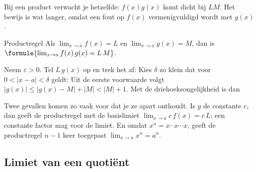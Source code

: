 Bij een product verwacht je hetzelfde: $f(x)g(x)$ komt dicht bij $LM$. Het bewijs is wat langer, omdat een fout op $f(x)$ vermenigvuldigd wordt met $g(x)$.

\begin{theorie}
\begin{stelling}{Productregel}
Als $\lim_{x \to a} f(x) = L$ en $\lim_{x \to a} g(x) = M$, dan is \quad $\formule{\lim_{x \to a} f(x)\,g(x) = L\,M}$.
\end{stelling}
\begin{bewijs}
Neem $\varepsilon > 0$. Tel $L\,g(x)$ op en trek het af:
Kies $\delta$ zo klein dat voor $0 < |x - a| < \delta$ geldt:
Uit de eerste voorwaarde volgt $|g(x)| \leqslant |g(x) - M| + |M| < |M| + 1$. Met de driehoeksongelijkheid is dan
\end{bewijs}
\end{theorie}

Twee gevallen komen zo vaak voor dat je ze apart onthoudt. Is $g$ de constante $c$, dan geeft de productregel met de basislimiet $\lim_{x \to a} c\,f(x) = c\,L$: een constante factor mag voor de limiet. En omdat $x^n = x \cdot x \cdots x$, geeft de productregel $n - 1$ keer toegepast $\lim_{x \to a} x^n = a^n$.


\begin{oefeningen}
\end{oefeningen}

\subsection{Limiet van een quotiënt}

